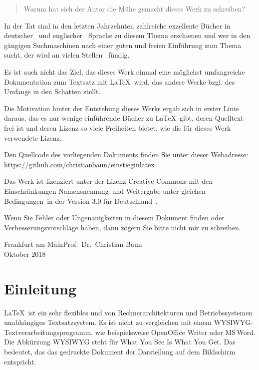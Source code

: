 \documentclass[a4paper,10pt,twoside]{scrbook}
\begin{document}
\begin{quote}
\glqq Warum hat sich der Autor die Mühe gemacht dieses Werk zu schreiben?\grqq
\end{quote}

In der Tat sind in den letzten Jahrzehnten zahlreiche exzellente Bücher in deutscher~\cite{Kopka2000,GoossensMittelachSamarin2000,voss2016einfuhrung} und englischer~\cite{mittelbach2004latex,kopka2003guide} Sprache zu diesem Thema erschienen und wer in den gängigen Suchmaschinen nach einer guten und freien Einführung zum Thema sucht, der wird an vielen Stellen~\cite{KrauseLink,JuergensFeuerstackLink,RichterTorstenLink,MarxBueckerLink,NagelLink,GitterLink} fündig.

Es ist auch nicht das Ziel, das dieses Werk einmal eine möglichst umfangreiche Dokumentation zum Textsatz mit \LaTeX\ wird, das andere Werke bzgl. des Umfangs in den Schatten stellt. 

Die Motivation hinter der Entstehung dieses Werks ergab sich in erster Linie daraus, das es nur wenige einführende Bücher zu \LaTeX\ gibt, deren Quelltext frei ist und deren Lizenz so viele Freiheiten bietet, wie die für dieses Werk verwendete Lizenz.

Den Quellcode des vorliegenden Dokuments finden Sie unter dieser Webadresse:\\
\url{https://github.com/christianbaun/einstieginlatex}

Das Werk ist lizenziert unter der Lizenz Creative Commons mit den Einschränkungen \glqq Namensnennung\grqq\ und \glqq Weitergabe unter gleichen Bedingungen\grqq\ in der Version 3.0 für Deutschland~\cite{CC-BY-SA-3.0License}.

Wenn Sie Fehler oder Ungenauigkeiten in diesem Dokument finden oder Verbesserungsvorschläge haben, dann zögern Sie bitte nicht mir zu schreiben. 

\begin{flushright} 
Frankfurt am Main\hfill Prof.~Dr.~Christian Baun\\
Oktober 2018
\end{flushright}

\mainmatter        %


\mainmatter

\chapter{Einleitung}


\LaTeX\ ist ein sehr flexibles und von Rechnerarchitekturen
und Betriebssystemen unabhängiges 
Textsatzsystem. Es ist nicht zu vergleichen mit einem WYSIWYG-Textverarbeitungsprogramm, wie beispielsweise OpenOffice Writer oder MS\,Word. Die Abkürzung WYSIWYG steht für \glqq What You See Is What You Get\grqq. Das bedeutet, das das gedruckte Dokument der Darstellung auf dem Bildschirm entspricht. 
\end{document}
